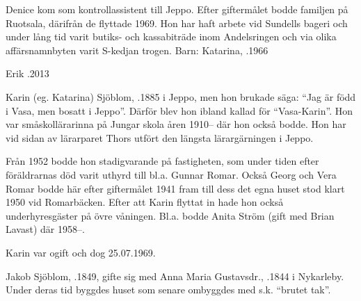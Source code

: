 
Denice kom som kontrollassistent till Jeppo. Efter giftermålet bodde familjen på Ruotsala, därifrån de flyttade 1969. Hon har haft arbete vid Sundells bageri och under lång tid varit butiks- och kassabiträde inom Andelsringen och via olika affärsnamnbyten varit S-kedjan trogen.
Barn: Katarina, .1966

Erik .2013



Karin (eg. Katarina) Sjöblom, .1885 i Jeppo, men hon brukade säga: ``Jag är född i Vasa, men bosatt i Jeppo''.  Därför blev hon ibland kallad för ``Vasa-Karin''. Hon var småskollärarinna på Jungar skola åren 1910-- där hon också bodde. Hon har vid sidan av lärarparet Thors utfört den längsta lärargärningen i Jeppo.

Från 1952 bodde hon stadigvarande på fastigheten, som under tiden efter föräldrarnas död varit uthyrd till bl.a. Gunnar Romar. Också Georg och Vera Romar bodde här efter giftermålet 1941 fram till dess det egna huset stod klart 1950 vid Romarbäcken. Efter att Karin flyttat in hade hon också underhyresgäster på övre våningen. Bl.a. bodde Anita Ström (gift med Brian Lavast) där 1958--.

Karin var ogift och dog 25.07.1969.



Jakob Sjöblom, .1849, gifte sig med Anna Maria Gustavsdr., .1844 i Nykarleby. Under deras tid byggdes huset som senare ombyggdes med s.k. ``brutet tak''.
\begin{jhchildren}
  \item {}
  \item {}
  \item {}
  \item {}
  \item {}
  \item {}
  \item {}
\end{jhchildren}

